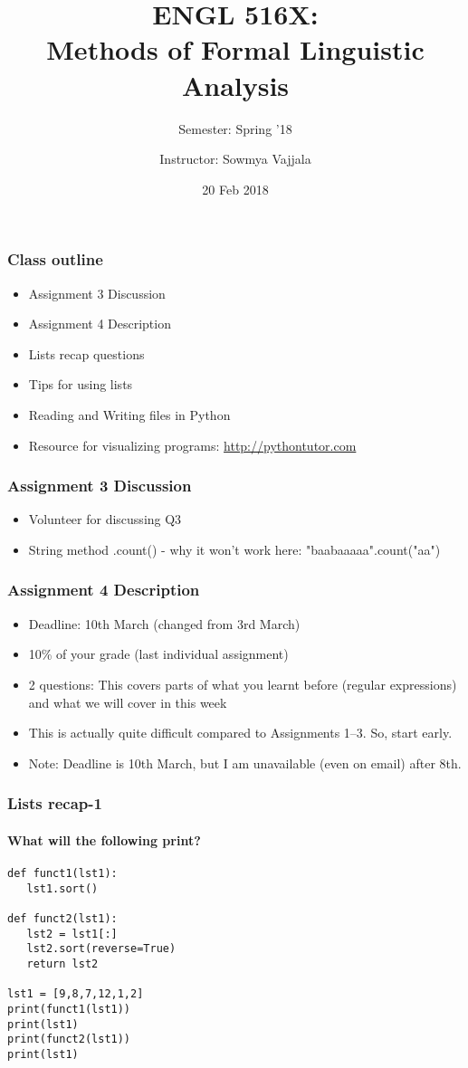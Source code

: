 \documentclass{beamer}
\author[Sowmya Vajjala]{Instructor: Sowmya Vajjala}
\title[ENGL 516X]{ENGL 516X: \\ Methods of Formal Linguistic Analysis}
\subtitle{Semester: Spring '18}
\date{20 Feb 2018}
\institute{Iowa State University, USA}
\begin{document}
\begin{frame}\titlepage
\end{frame}

\begin{frame}%
\frametitle{Class outline}
\begin{itemize}
\item Assignment 3 Discussion
\item Assignment 4 Description
\item Lists recap questions
\item Tips for using lists
\item Reading and Writing files in Python
\item Resource for visualizing programs: \url{http://pythontutor.com}
\end{itemize}
\end{frame}

\begin{frame}
\frametitle{Assignment 3 Discussion}
\begin{itemize}
\item Volunteer for discussing Q3 \pause
\item String method .count() - why it won't work here: "baabaaaaa".count("aa")
\end{itemize}
\end{frame}

\begin{frame}
\frametitle{Assignment 4 Description}
\begin{itemize}
\item Deadline: 10th March (changed from 3rd March)
\item 10\% of your grade (last individual assignment)
\item 2 questions: This covers parts of what you learnt before (regular expressions) and what we will cover in this week
\item This is actually quite difficult compared to Assignments 1--3. So, start early.
\item Note: Deadline is 10th March, but I am unavailable (even on email) after 8th.
\end{itemize}
\end{frame}

\begin{frame}[fragile]
\frametitle{Lists recap-1}
\framesubtitle{What will the following print?}
\begin{verbatim}
def funct1(lst1):
   lst1.sort()

def funct2(lst1):
   lst2 = lst1[:]
   lst2.sort(reverse=True)
   return lst2

lst1 = [9,8,7,12,1,2]
print(funct1(lst1))
print(lst1)
print(funct2(lst1))
print(lst1)
\end{verbatim}
\end{frame}
\end{document}
